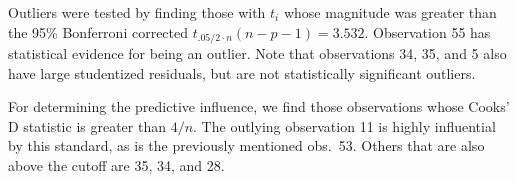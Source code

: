 \documentclass{homework}
\begin{document}
\begin{longproblem}
  Outliers were tested by finding those with $t_i$ whose magnitude was greater than the 95\% Bonferroni corrected $t_{.05/2\cdot n}(n-p-1)=3.532$.  Observation 55 has statistical evidence for being an outlier.  Note that observations 34, 35, and 5 also have large studentized residuals, but are not statistically significant outliers.
\newpage


  For determining the predictive influence, we find those
  observations whose Cooks' D statistic is greater than $4/n$.  The
  outlying observation 11 is highly influential by this standard, as
  is the previously mentioned obs.~53.  Others that are also above
  the cutoff are 35, 34, and 28.
\end{longproblem}
\end{document}
